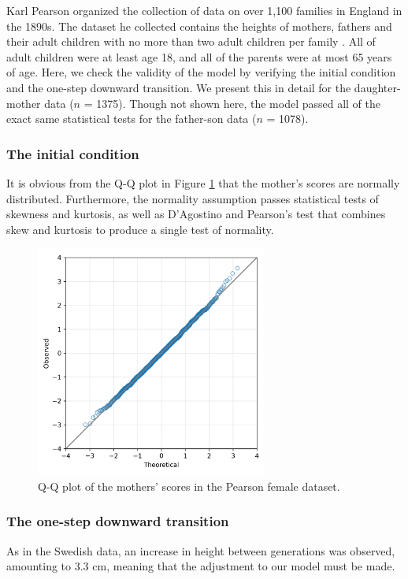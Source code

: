 \documentclass[letterpaper,10pt]{article} %
\begin{document}
Karl Pearson organized the collection of data on over 1,100 families in England in the 1890s. The dataset he collected contains the heights of mothers, fathers and their adult children with no more than two adult children per family \cite{pearson}. All of adult children were at least age 18, and all of the parents were at most 65 years of age. Here, we check the validity of the model by verifying the initial condition and the one-step downward transition. We present this in detail for the daughter-mother data ($n$ = 1375). Though not shown here, the model passed all of the exact same statistical tests for the father-son data ($n$ = 1078).


\subsubsection*{The initial condition}

It is obvious from the Q-Q plot in Figure \ref{fig:qq_pearson_x} that the mother's scores are normally distributed. Furthermore, the normality assumption passes statistical tests of skewness and kurtosis, as well as D’Agostino and Pearson's test that combines skew and kurtosis to produce a single test of normality.

\begin{figure}[h]
\includegraphics[width=3in]{figures/qq_pearson_x.png}
\centering
\caption{Q-Q plot of the mothers' scores in the Pearson female dataset.}
\label{fig:qq_pearson_x}
\end{figure}


\subsubsection*{The one-step downward transition}

As in the Swedish data, an increase in height between generations was observed, amounting to 3.3 cm, meaning that the adjustment to our model must be made. 
\end{document}
